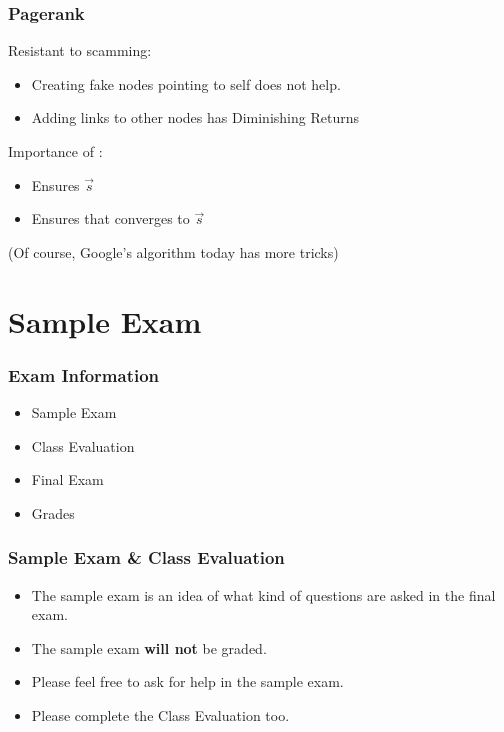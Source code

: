 \documentclass{beamer}
\begin{document}
\begin{frame}
  \frametitle{Pagerank}

  Resistant to \alert{scamming}:
  \begin{itemize}
  \item Creating \alert{fake nodes pointing to self} does not help.
  \item Adding links to other nodes has \alert{Diminishing Returns}
  \end{itemize}
  \vfill

  Importance of :
  \begin{itemize}
  \item Ensures  $\overrightarrow{s}$
  \item Ensures that  converges to $\overrightarrow{s}$ 
  \end{itemize}

  \vfill
  \hfill (Of course, Google's algorithm today has more tricks)
  
\end{frame}

\section{Sample Exam}

\begin{frame}
  \frametitle{Exam Information}

  \begin{itemize}
  \item Sample Exam
  \item Class Evaluation
  \item Final Exam
  \item Grades    
  \end{itemize}
\end{frame}

\begin{frame}
  \frametitle{Sample Exam \& Class Evaluation}

  \begin{itemize}
  \item The sample exam is an idea of what kind of questions are asked in the final exam.
    \bigskip
    
  \item The sample exam {\bf will not} be graded.
    \bigskip
    
  \item Please feel free to ask for help in the sample exam.
    \bigskip

  \item Please complete the Class Evaluation too.    
  \end{itemize}
\end{frame}
\end{document}
